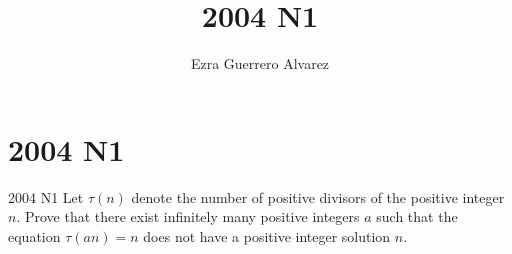 \documentclass[14pt]{article}
\title{2004 N1}
\author{Ezra Guerrero Alvarez}
\begin{document}
\maketitle
	
\section*{2004 N1}

\begin{statement}{2004 N1}
	Let $\tau(n)$ denote the number of positive divisors of the positive integer $n$. Prove that there exist infinitely many positive integers $a$ such that the equation $ \tau(an)=n $ does not have a positive integer solution $n$.
\end{statement}

	
\end{document}
